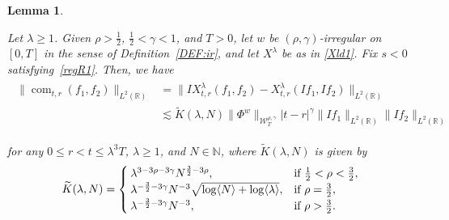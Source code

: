 \documentclass[letterpaper, 11pt,  reqno]{amsart}
\newtheorem{lemma}[theorem]{Lemma}
\DeclareMathOperator{\com}{com}
\newcommand{\1}{\hspace{0.5mm}\text{I}\hspace{0.5mm}}
\newcommand{\noi}{\noindent}
\newcommand{\R}{\mathbb{R}}
\newcommand{\g}{\gamma}
\newcommand{\ld}{\lambda}
\newcommand{\wt}{\widetilde}
\newcommand{\les}{\lesssim}
\newcommand{\jb}[1]
{\langle #1 \rangle}
\newcommand{\N}{\mathbb{N}}
\newcommand{\W}{\mathcal{W}}
\numberwithin{equation}{section}
\numberwithin{theorem}{section}
\begin{document}
\begin{lemma}
\label{LEM:com2}

Let $\ld \ge 1$.
Given $\rho  >  \frac 12$,  $\frac 12 < \g < 1$,  and $T> 0$, 
let  $w$ be $(\rho,\g)$-irregular
on $[0, T]$ 
 in the sense of Definition~\ref{DEF:ir}, 
 and let $X^\ld$ be as in \eqref{Xld1}.
Fix  $s < 0$ satisfying~\eqref{regR1}.
Then, we have 
\begin{align}
\begin{aligned}
 \|\com_{t, r}(f_1, f_2) \|_{L^2(\R)}
 &  = \|IX^{\ld}_{t,r}( f _1, f _2) - X^{\ld}_{t,r} (I f _1,I f _2) \|_{L^2(\R)}\\
& \les
\wt    K(\ld, N )\| \Phi^{w} \|_{\W_{T}^{\rho, \g}}
      |t-r|^{\g}
\| I  f _1 \|_{L^2(\R)}   \| I  f _2 \|_{L^2(\R)}  
\end{aligned}
\label{RI1}
\end{align}





\noi
for any $0\leq r<t\leq \ld^3T$, $\ld \ge 1$, and $N \in \N$, 
where $ \wt K(\ld, N )$ is 
given by 
\begin{align}
\wt K(\ld, N )
= \begin{cases}
\ld^{3- 3\rho-3\g} N^{\frac 32 - 3\rho}, & \text{if $\frac 12 < \rho < \frac 32$}, \\
\ld^{- \frac 32 - 3\g} N^{-3} \sqrt{\log \jb{N} + \log \jb{\ld}}, & \text{if $\rho =  \frac 32$}, \\
\ld^{ - \frac 32 - 3\g } N^{-3}, & \text{if $ \rho >  \frac 32$}.
\end{cases}
\label{RI1a}
\end{align}





\end{lemma}
\end{document}
